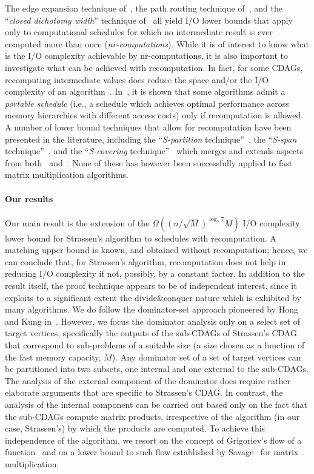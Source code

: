 \documentclass[a4paper,UKenglish]{lipics-v2016}
\newcommand{\io }{I/O }
\begin{document}
The edge expansion technique of~\cite{ballard2012graph}, the path
routing technique of~\cite{scott2015matrix}, and the ``\emph{closed dichotomy
width}'' technique of~\cite{bilardi1999processor} all yield \io lower
bounds that apply only to computational schedules for which no
intermediate result is ever computed more than once
(\emph{nr-computations}). 
While it is of interest to know what is the
\io complexity achievable by nr-computations, it is also
important to investigate what can be achieved with recomputation. In
fact, for some CDAGs, recomputing intermediate values does reduce the
space and/or the \io complexity of an
algorithm~\cite{savage1995extending}.
In~\cite{bilardi2001characterization}, it is shown that some
algorithms admit a \emph{portable schedule} (i.e., a schedule which
achieves optimal performance across memory hierarchies with different
access costs) only if recomputation is allowed. A number of lower
bound techniques that allow for recomputation have been presented in
the literature, including the ``\emph{S-partition}
technique''~\cite{jia1981complexity}, the ``\emph{S-span}
technique''~\cite{savage1995extending}, and the ``\emph{S-covering}
technique''~\cite{bilardi2000space} which merges and extends aspects
from both~\cite{jia1981complexity}
and~\cite{savage1995extending}. None of these has however been
successfully applied to fast matrix multiplication algorithms.

\paragraph*{Our results}

Our main result is the extension of the $\Omega((n/\sqrt{M})^{\log_2
  7}M)$ \io complexity lower bound for Strassen's algorithm to
schedules with recomputation. A matching upper bound is known, and
obtained without recomputation; hence, we can conclude that, for
Strassen's algorithm, recomputation does not help in reducing \io
complexity if not, possibly, by a constant factor. In addition to the
result itself, the proof technique appears to be of independent
interest, since it exploits to a significant extent the
divide\&conquer nature which is exhibited by many algorithms.  We do
follow the dominator-set approach pioneered by Hong and Kung
in~\cite{jia1981complexity}. However, we focus the dominator analysis
only on a select set of target vertices, specifically the outputs of
the sub-CDAGs of Strassen's CDAG that correspond to sub-problems of a
suitable size (a size chosen as a function of the fast memory
capacity, $M$).  Any dominator set of a set of target vertices can be
partitioned into two subsets, one internal and one external to the
sub-CDAGs. The analysis of the external component of the dominator does
require rather elaborate arguments that are specific to Strassen's
CDAG. In contrast, the analysis of the internal component can be
carried out based only on the fact that the sub-CDAGs compute matrix
products, irrespective of the algorithm (in our case, Strassen's) by
which the products are computed.  To achieve this independence of the
algorithm, we resort on the concept of Grigoriev's flow of a
function~\cite{grigor1976application} and on a lower bound to such
flow established by Savage~\cite{savage97models} for matrix
multiplication.
\end{document}
